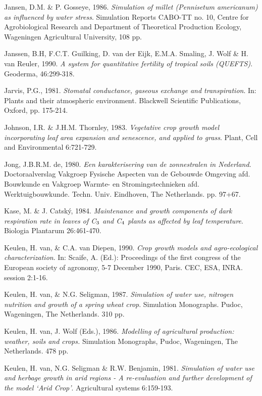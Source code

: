 Jansen, D.M. \& P. Gosseye, 1986. {\it Simulation of millet (Pennisetum americanum) as influenced by
water stress\/}. Simulation Reports CABO-TT no. 10, Centre for Agrobiological Research and
Department of Theoretical Production Ecology, Wageningen Agricultural University, 108 pp.

Janssen, B.H, F.C.T. Guilking, D. van der Eijk, E.M.A. Smaling, J. Wolf \& H. van Reuler, 1990.
{\it A system for quantitative fertility of tropical soils (QUEFTS)\/}. Geoderma, 46:299-318.

Jarvis, P.G., 1981. {\it Stomatal conductance, gaseous exchange and transpiration\/}. In: Plants and their
atmospheric environment. Blackwell Scientific Publications, Oxford, pp. 175-214.

Johnson, I.R. \& J.H.M. Thornley, 1983. {\it Vegetative crop growth model incorporating leaf area
expansion and senescence, and applied to grass\/}. Plant, Cell and Environmental 6:721-729.

Jong, J.B.R.M. de, 1980. {\it Een karakterisering van de zonnestralen in Nederland\/}. Doctoraalverslag
Vakgroep Fysische Aspecten van de Gebouwde Omgeving afd. Bouwkunde en Vakgroep Warmte-
en Stromingstechnieken afd. Werktuigbouwkunde. Techn. Univ. Eindhoven, The Netherlands. pp.
97+67.

\bigskip
Kase, M. \& J. Catsk\'{y}, 1984. {\it Maintenance and growth components of dark respiration rate in leaves
of C$_{{\rm 3}}$ and C$_{{\rm 4}}$ plants as affected by leaf temperature\/}. Biologia Plantarum 26:461-470.

Keulen, H. van, \& C.A. van Diepen, 1990. {\it Crop growth models and agro-ecological charac\-terizati\-on\/}. In: Scaife, A. (Ed.): Proceedings of the first con\-gress of the European so\-cie\-ty of agronomy, 5-7
December 1990, Paris. CEC, ESA, INRA. session 2:1-16.

Keulen, H. van, \& N.G. Seligman, 1987. {\it Simulation of water use, nitrogen nutrition and growth of
a spring wheat crop\/}. Simulation Monographs. Pudoc, Wageningen, The Netherlands. 310 pp.

Keulen, H. van, J. Wolf (Eds.), 1986. {\it Modelling of agricultural production: weather, soils and
crops.\/} Simulation Monographs, Pudoc, Wageningen, The Netherlands. 478 pp. 

Keulen, H. van, N.G. Seligman \& R.W. Benjamin, 1981. {\it Simula\-tion of water use and herbage
growth in arid\/} {\it regions - A re-evaluation and further development of the model `Arid Crop'\/}.
Agricultural systems 6:159-193.

